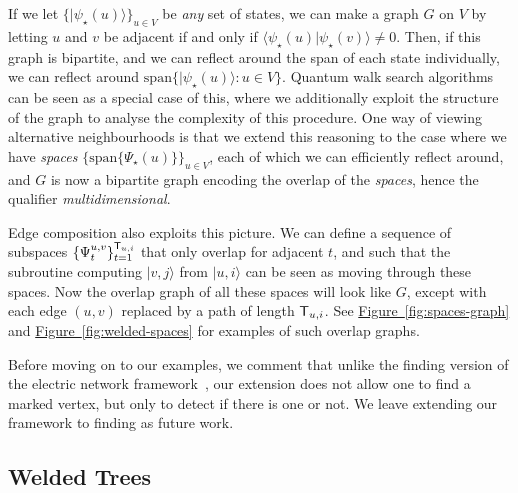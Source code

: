 \documentclass{theoretics}
\newcommand{\fig}[1]{\hyperref[fig:#1]{Figure~\ref*{fig:#1}}}
\def\ket#1{{\lvert}#1\rangle}
\renewcommand{\>}{\rangle}
\newcommand{\<}{\langle}
\renewcommand{\(}{\left(}
\renewcommand{\)}{\right)}
\def\braket#1#2{{{\langle}#1\vert}#2\rangle}
\begin{document}
If we let $\{\ket{\psi_\star(u)}\}_{u\in V}$ be \emph{any} set of states, we can make a graph $G$ on $V$ by letting $u$ and $v$ be adjacent if and only if $\braket{\psi_\star(u)}{\psi_\star(v)}\neq 0$. Then, if this graph is bipartite, and we can reflect around the span of each state individually, we can reflect around $\mathrm{span}\{\ket{\psi_\star(u)}:u\in V\}$. Quantum walk search algorithms can be seen as a special case of this, where we additionally exploit the structure of the graph to analyse the complexity of this procedure. One way of viewing alternative neighbourhoods is that we extend this reasoning to the case where we have \emph{spaces} $\{\mathrm{span}\{\Psi_\star(u)\}\}_{u\in V}$, each of which we can efficiently reflect around, and $G$ is now a bipartite graph encoding the overlap of the \emph{spaces}, hence the qualifier \emph{multidimensional}.

Edge composition also exploits this picture. We can define a sequence of subspaces $\{\Psi_t^{u,v}\}_{t=1}^{{\sf T}_{u,i}}$ that only overlap for adjacent $t$, and such that the subroutine computing $\ket{v,j}$ from $\ket{u,i}$ can be seen as moving through these spaces. Now the overlap graph of all these spaces will look like $G$, except with each edge $(u,v)$ replaced by a path of length ${\sf T}_{u,i}$.
See \fig{spaces-graph} and \fig{welded-spaces} for examples of such overlap graphs. 


Before moving on to our examples, we comment that unlike the finding version of the electric network framework~\cite{apers2019UnifiedFrameworkQWSearch}, our extension does not allow one to find a marked vertex, but only to detect if there is one or not. We leave extending our framework to finding as future work. 

\subsection{Welded Trees}
\end{document}
